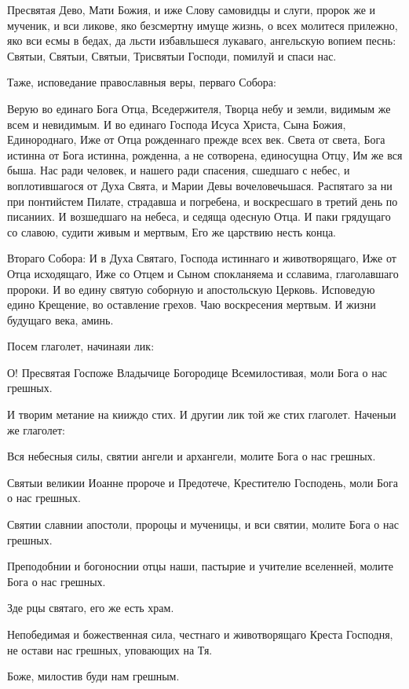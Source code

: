 Пресвятая Дево, Мати Божия, и иже Слову самовидцы и слуги, пророк же и мученик, и вси ликове, яко безсмертну имуще жизнь, о всех молитеся прилежно, яко вси есмы в бедах, да льсти избавльшеся лукаваго, ангельскую вопием песнь: Святыи, Святыи, Святыи, Трисвятыи Господи, помилуй и спаси нас.


Таже, исповедание православныя веры, перваго Собора:


Верую во единаго Бога Отца, Вседержителя, Творца небу и земли, видимым же всем и невидимым. И во единаго Господа Исуса Христа, Сына Божия, Единороднаго, Иже от Отца рожденнаго прежде всех век. Света от света, Бога истинна от Бога истинна, рожденна, а не сотворена, единосущна Отцу, Им же вся быша. Нас ради человек, и нашего ради спасения, сшедшаго с небес, и воплотившагося от Духа Свята, и Марии Девы вочеловечьшася. Распятаго за ни при понтийстем Пилате, страдавша и погребена, и воскресшаго в третий день по писаниих. И возшедшаго на небеса, и седяща одесную Отца. И паки грядущаго со славою, судити живым и мертвым, Его же царствию несть конца.


Втораго Собора: И в Духа Святаго, Господа истиннаго и животворящаго, Иже от Отца исходящаго, Иже со Отцем и Сыном спокланяема и сславима, глаголавшаго пророки. И во едину святую соборную и апостольскую Церковь. Исповедую едино Крещение, во оставление грехов. Чаю воскресения мертвым. И жизни будущаго века, аминь.


Посем глаголет, начинаяи лик:


О! Пресвятая Госпоже Владычице Богородице Всемилостивая, моли Бога о нас грешных.


И творим метание на кииждо стих. И другии лик той же стих глаголет. Наченыи же глаголет:


Вся небесныя силы, святии ангели и архангели, молите Бога о нас грешных.


Святыи великии Иоанне пророче и Предотече, Крестителю Господень, моли Бога о нас грешных.


Святии славнии апостоли, пророцы и мученицы, и вси святии, молите Бога о нас грешных.


Преподобнии и богоноснии отцы наши, пастырие и учителие вселенней, молите Бога о нас грешных.


Зде рцы святаго, его же есть храм.


Непобедимая и божественная сила, честнаго и животворящаго Креста Господня, не остави нас грешных, уповающих на Тя.


Боже, милостив буди нам грешным.


